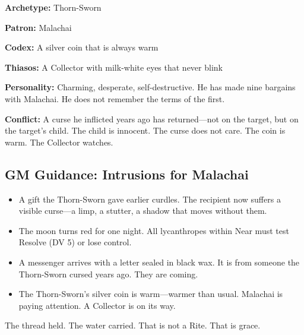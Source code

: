 \textbf{Archetype:} Thorn-Sworn

\textbf{Patron:} Malachai

\textbf{Codex:} A silver coin that is always warm

\textbf{Thiasos:} A Collector with milk-white eyes that never blink

\textbf{Personality:} Charming, desperate, self-destructive. He has made nine bargains with Malachai. He does not remember the terms of the first.

\textbf{Conflict:} A curse he inflicted years ago has returned—not on the target, but on the target's child. The child is innocent. The curse does not care. The coin is warm. The Collector watches.

\subsection{GM Guidance: Intrusions for Malachai}

\begin{itemize}
\item A gift the Thorn-Sworn gave earlier curdles. The recipient now suffers a visible curse—a limp, a stutter, a shadow that moves without them.
\item The moon turns red for one night. All lycanthropes within Near must test Resolve (DV 5) or lose control.
\item A messenger arrives with a letter sealed in black wax. It is from someone the Thorn-Sworn cursed years ago. They are coming.
\item The Thorn-Sworn's silver coin is warm—warmer than usual. Malachai is paying attention. A Collector is on its way.
\end{itemize}

The thread held. The water carried. That is not a Rite. That is grace.
